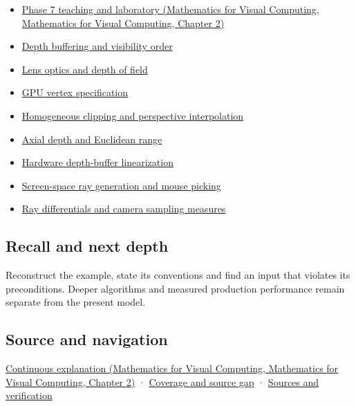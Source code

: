 \begin{itemize}
\item
  \href{../02-Mathematics-for-Visual-Computing/main.pdf\#nameddest=01-foundations-i-ch018-keep-the-promises-visible-while-moving-between-representations}{Phase 7 teaching and laboratory (Mathematics for Visual Computing, Mathematics for Visual Computing, Chapter 2)}
\item
  \hyperref[appendix-97578ed97952]{Depth buffering and visibility order}
\item
  \hyperref[appendix-21f8456e2629]{Lens optics and depth of field}
\item
  \hyperref[appendix-749ba51a6c25]{GPU vertex specification}
\item
  \hyperref[appendix-40426e4b2103]{Homogeneous clipping and perspective interpolation}
\item
  \hyperref[appendix-cac01ebeeb11]{Axial depth and Euclidean range}
\item
  \hyperref[appendix-1bc40b08db4a]{Hardware depth-buffer linearization}
\item
  \hyperref[appendix-f1a6d43e80d1]{Screen-space ray generation and mouse picking}
\item
  \hyperref[appendix-8c40fad29462]{Ray differentials and camera sampling measures}
\end{itemize}

\subsection{Recall and next depth}\label{appendix-1c07d64f5e70-recall-and-next-depth}

Reconstruct the example, state its conventions and find an input that violates its preconditions. Deeper algorithms and measured production performance remain separate from the present model.

\subsection{Source and navigation}\label{appendix-1c07d64f5e70-source-and-navigation}

\href{../02-Mathematics-for-Visual-Computing/main.pdf\#nameddest=01-foundations-i-ch018-keep-the-promises-visible-while-moving-between-representations}{Continuous explanation (Mathematics for Visual Computing, Mathematics for Visual Computing, Chapter 2)} · \hyperref[appendix-fd090d982a15-phase-7---parts-601-700]{Coverage and source gap} · \hyperref[appendix-a103e7846d21-phase-7---source-analysis-and-verification]{Sources and verification}

